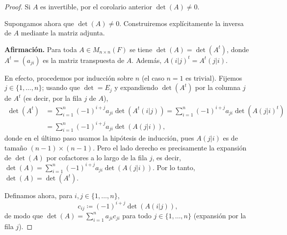 \documentclass[12pt,a4paper]{book}
\newcommand{\llaves}[1]{\{#1\}}
\begin{document}
    \begin{proof}
        Si $A$ es invertible, por el corolario anterior $\det(A) \neq 0$.

        Supongamos ahora que $\det(A) \neq 0$. Construiremos explícitamente la inversa de $A$ mediante la matriz adjunta.

        \textbf{Afirmación.} Para toda $A \in M_{n \times n}(F)$ se tiene $\det(A) = \det(A^t)$, donde $A^t = (a_{ji})$ es la matriz transpuesta de $A$. Además, $A(i|j)^t = A^t(j|i)$.

        En efecto, procedemos por inducción sobre $n$ (el caso $n = 1$ es trivial). Fijemos $j \in \llaves{1, \dots, n}$; usando que $\det = E_j$ y expandiendo $\det(A^t)$ por la columna $j$ de $A^t$ (es decir, por la fila $j$ de $A$),
        \begin{align*}
            \det(A^t) & = \sum_{i=1}^n (-1)^{i+j} a_{ji} \det(A^t(i|j)) = \sum_{i=1}^n (-1)^{i+j} a_{ji} \det(A(j|i)^t) \\
            & = \sum_{i=1}^n (-1)^{i+j} a_{ji} \det(A(j|i)),
        \end{align*}
        donde en el último paso usamos la hipótesis de inducción, pues $A(j|i)$ es de tamaño $(n-1) \times (n-1)$. Pero el lado derecho es precisamente la expansión de $\det(A)$ por cofactores a lo largo de la fila $j$, es decir,
        $\det(A) = \sum_{i=1}^n (-1)^{i+j} a_{ji} \det(A(j|i))$. Por lo tanto, $\det(A) = \det(A^t)$.

        Definamos ahora, para $i, j \in \llaves{1, \dots, n}$,
        \begin{equation*}
            c_{ij} \coloneqq (-1)^{i+j} \det(A(i|j)),
        \end{equation*}
        de modo que $\det(A) = \sum_{i=1}^n a_{ji} c_{ji}$ para todo $j \in \llaves{1, \dots, n}$ (expansión por la fila $j$).


\end{proof}
\end{document}
